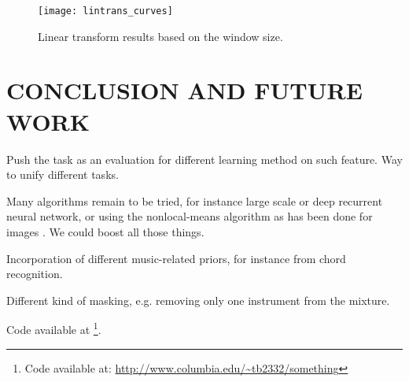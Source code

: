 \documentclass{article}
\begin{document}
\begin{figure}[t]
\begin{center}
\texttt{[image: lintrans\_curves]}
\end{center}
\caption{Linear transform results based on the window size.}
\label{fig:lintrans}
\end{figure}


\section{CONCLUSION AND FUTURE WORK}
\label{sec:conclusion}
Push the task as an evaluation for different learning method on such feature.
Way to unify different tasks.

Many algorithms remain to be tried, for instance large scale or deep recurrent
neural network, or using the nonlocal-means algorithm as has been done for
images \cite{Buades2005}. We could boost all those things.

Incorporation of different music-related priors, for instance from chord recognition.

Different kind of masking, e.g. removing only one instrument from the mixture.

Code available at \footnote{Code available at: \url{http://www.columbia.edu/~tb2332/something}}.





\end{document}
